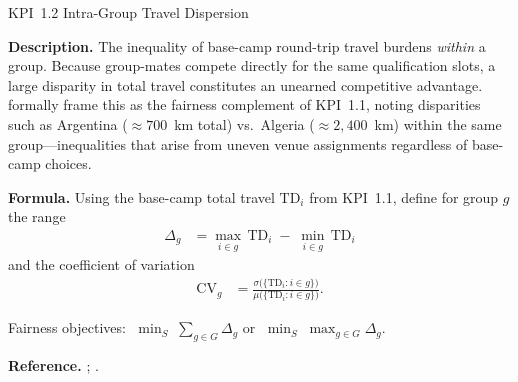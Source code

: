 \documentclass[12pt, letterpaper]{article}
\newcommand{\kpilabel}[1]{\noindent\textbf{#1}\enspace}
\begin{document}
\begin{kpibox}{KPI~1.2 \textendash{} Intra-Group Travel Dispersion}

\kpilabel{Description.}
The inequality of base-camp round-trip travel burdens \emph{within} a
group.  Because group-mates compete directly for the same qualification
slots, a large disparity in total travel constitutes an unearned
competitive advantage.  \citet{GuajardoEtAl2026} formally frame this
as the fairness complement of KPI~1.1, noting disparities such as
Argentina ($\approx700$~km total) vs.\ Algeria ($\approx2{,}400$~km)
within the same group---inequalities that arise from uneven venue
assignments regardless of base-camp choices.

\medskip
\kpilabel{Formula.}
Using the base-camp total travel $\mathrm{TD}_i$ from KPI~1.1,
define for group $g$ the range
\begin{align*}
  \Delta_g &= \max_{i \in g}\,\mathrm{TD}_i \;-\;
              \min_{i \in g}\,\mathrm{TD}_i
\end{align*}
and the coefficient of variation
\begin{align*}
  \mathrm{CV}_g &=
    \frac{\sigma\!\bigl(\{\mathrm{TD}_i : i \in g\}\bigr)}
         {\mu\!\bigl(\{\mathrm{TD}_i : i \in g\}\bigr)}.
\end{align*}
\vspace{-8pt}

\noindent
Fairness objectives: $\;\displaystyle\min_{S}\;\sum_{g \in G}\Delta_g$
\;or\; $\;\displaystyle\min_{S}\;\max_{g \in G}\Delta_g$.

\medskip
\kpilabel{Reference.}
\citet{GuajardoEtAl2026}; \citet{MikamiTravel2026}.
\end{kpibox}
\end{document}
